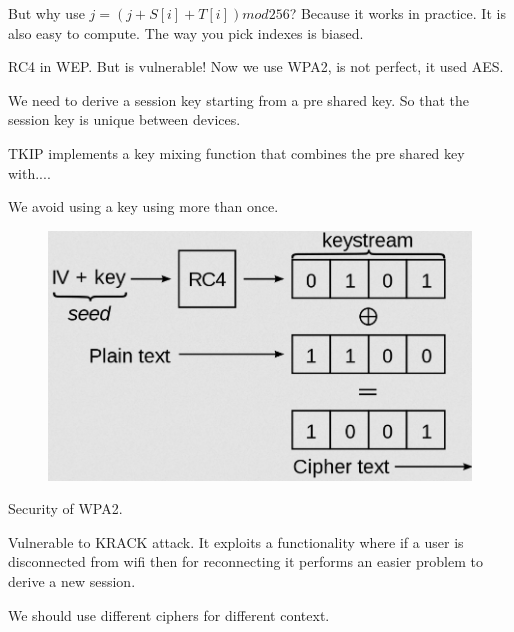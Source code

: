 But why use $j = (j + S[i] + T[i]) mod 256$? Because it works in practice. It is also easy to compute.
The way you pick indexes is biased.

RC4 in WEP. But is vulnerable!
Now we use WPA2, is not perfect, it used AES.

We need to derive a session key starting from a pre shared key. So that the session key is unique between devices.

TKIP implements a key mixing function that combines the pre shared key with....

We avoid using a key using more than once. 

\begin{figure}
	\centering
	\includegraphics[width=0.7\linewidth]{Images/Chapter2/screenshot014}
	\caption{}
	\label{fig:chapter2_screenshot014}
\end{figure}

Security of WPA2.

Vulnerable to KRACK attack. It exploits a functionality where if a user is disconnected from wifi then for reconnecting it performs an easier problem to derive a new session.

We should use different ciphers for different context. 